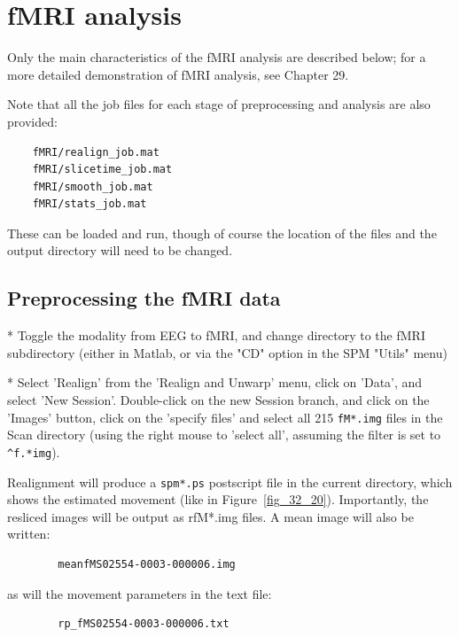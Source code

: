 \section{fMRI analysis \label{fMRI}}

Only the main characteristics of the fMRI analysis are described below; for a more detailed demonstration of fMRI analysis, see Chapter 29.

Note that all the job files for each stage of preprocessing and analysis are also provided:
\begin{verbatim}
	fMRI/realign_job.mat
	fMRI/slicetime_job.mat
	fMRI/smooth_job.mat
	fMRI/stats_job.mat
\end{verbatim}
These can be loaded and run, though of course the location of the files and the output directory will need to be changed.

\subsection{Preprocessing the fMRI data}

* Toggle the modality from EEG to fMRI, and change directory to the fMRI subdirectory (either in Matlab, or via the "CD" option in the SPM "Utils" menu)

* Select 'Realign' from the 'Realign and Unwarp' menu, click on 'Data', and select 'New Session'. Double-click on the new Session branch, and click on the 'Images' button, click on the 'specify files' and select all 215 \verb!fM*.img! files in the Scan directory (using the right mouse to 'select all', assuming the filter is set to \verb!^f.*img!).

Realignment will produce a \verb!spm*.ps! postscript file in the current directory, which shows the estimated movement (like in Figure~\ref{fig_32_20}). Importantly, the resliced images will be output as rfM*.img files. A mean image will also be written:
\begin{verbatim}
		meanfMS02554-0003-000006.img
\end{verbatim}
as will the movement parameters in the text file:
\begin{verbatim}
		rp_fMS02554-0003-000006.txt
\end{verbatim}

